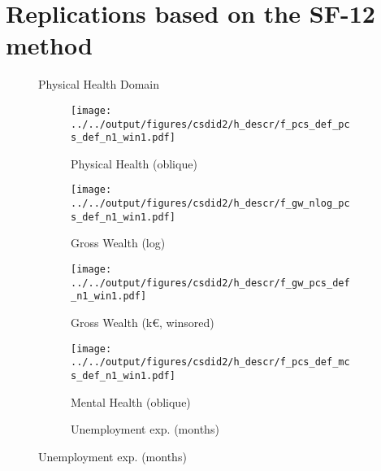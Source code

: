 \chapter{Replications based on the SF-12 method}%
%
\begin{figure}
    \centering \setcounter{subfigure}{0}%
    \renewcommand{\thesubfigure}{P\alph{subfigure}}
    Physical Health Domain
    \\ %
    \begin{subfigure}{0.32\textwidth}
        \caption{Physical Health (oblique)}
        \texttt{[image: ../../output/figures/csdid2/h\_descr/f\_pcs\_def\_pcs\_def\_n1\_win1.pdf]}
        \label{sfig:fpcsdefpcsdef}
    \end{subfigure}
    \begin{subfigure}{0.32\textwidth}
        \caption{Gross Wealth (log)}
        \texttt{[image: ../../output/figures/csdid2/h\_descr/f\_gw\_nlog\_pcs\_def\_n1\_win1.pdf]}
        \label{sfig:fgwnlogpcsdef}
    \end{subfigure}
    \begin{subfigure}{0.32\textwidth}
        \caption{Gross Wealth (k€, winsored)}
        \texttt{[image: ../../output/figures/csdid2/h\_descr/f\_gw\_pcs\_def\_n1\_win1.pdf]}
        \label{sfig:fgwpcsdef}
    \end{subfigure}
    \begin{subfigure}{0.32\textwidth}
        \caption{Mental Health (oblique)}
        \texttt{[image: ../../output/figures/csdid2/h\_descr/f\_pcs\_def\_mcs\_def\_n1\_win1.pdf]}
        \label{sfig:fpcsdefmcsdef}
    \end{subfigure}
    \begin{subfigure}{0.32\textwidth}
        \caption{Unemployment exp. (months)}

\end{subfigure}
\end{figure}
